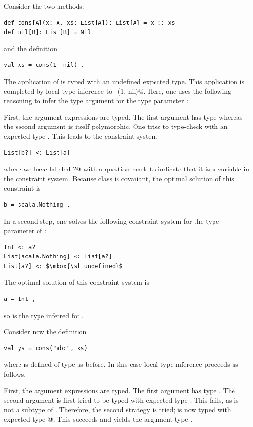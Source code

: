 \example Consider the two methods:
\begin{lstlisting}
def cons[A](x: A, xs: List[A]): List[A] = x :: xs
def nil[B]: List[B] = Nil
\end{lstlisting}
and the definition
\begin{lstlisting}
val xs = cons(1, nil) .
\end{lstlisting}
The application of  is typed with an undefined expected
type. This application is completed by local type inference to 
~\lstinline@cons[Int](1, nil)@. 
Here, one uses the following
reasoning to infer the type argument \lstinline@Int@ for the type
parameter :

First, the argument expressions are typed. The first argument 
has type  whereas the second argument \lstinline@nil@ is
itself polymorphic. One tries to type-check \lstinline@nil@ with an
expected type . This leads to the constraint system
\begin{lstlisting}
List[b?] <: List[a]
\end{lstlisting}
where we have labeled \lstinline@b?@ with a question mark to indicate
that it is a variable in the constraint system.
Because class \lstinline@List@ is covariant, the optimal
solution of this constraint is
\begin{lstlisting}
b = scala.Nothing .
\end{lstlisting}

In a second step, one solves the following constraint system for
the type parameter  of :
\begin{lstlisting}
Int <: a?
List[scala.Nothing] <: List[a?]
List[a?] <: $\mbox{\sl undefined}$
\end{lstlisting}
The optimal solution of this constraint system is
\begin{lstlisting}
a = Int ,
\end{lstlisting}
so  is the type inferred for .

\example Consider now the definition  
\begin{lstlisting}
val ys = cons("abc", xs)
\end{lstlisting}
where  is defined of type  as before.
In this case local type inference proceeds as follows.

First, the argument expressions are typed. The first argument
 has type . The second argument  is
first tried to be typed with expected type . This fails,
as  is not a subtype of . Therefore, 
the second strategy is tried;  is now typed with expected type
@. This succeeds and yields the argument type
.

